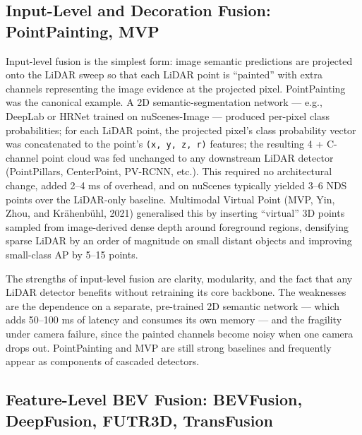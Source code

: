 \documentclass{article}
\begin{document}
\subsection{Input-Level and Decoration Fusion: PointPainting, MVP}\label{input-level-and-decoration-fusion-pointpainting-mvp}

Input-level fusion is the simplest form: image semantic predictions are projected onto the LiDAR sweep so that each LiDAR point is ``painted'' with extra channels representing the image evidence at the projected pixel. PointPainting \citep{vora2020pointpaintingseque} was the canonical example. A 2D semantic-segmentation network --- e.g., DeepLab or HRNet trained on nuScenes-Image --- produced per-pixel class probabilities; for each LiDAR point, the projected pixel's class probability vector was concatenated to the point's \texttt{(x,\ y,\ z,\ r)} features; the resulting 4 + C-channel point cloud was fed unchanged to any downstream LiDAR detector (PointPillars, CenterPoint, PV-RCNN, etc.). This required no architectural change, added 2--4 ms of overhead, and on nuScenes typically yielded 3--6 NDS points over the LiDAR-only baseline. Multimodal Virtual Point (MVP, Yin, Zhou, and Krähenbühl, 2021) generalised this by inserting ``virtual'' 3D points sampled from image-derived dense depth around foreground regions, densifying sparse LiDAR by an order of magnitude on small distant objects and improving small-class AP by 5--15 points.

The strengths of input-level fusion are clarity, modularity, and the fact that any LiDAR detector benefits without retraining its core backbone. The weaknesses are the dependence on a separate, pre-trained 2D semantic network --- which adds 50--100 ms of latency and consumes its own memory --- and the fragility under camera failure, since the painted channels become noisy when one camera drops out. PointPainting and MVP are still strong baselines and frequently appear as components of cascaded detectors.

\subsection{Feature-Level BEV Fusion: BEVFusion, DeepFusion, FUTR3D, TransFusion}\label{feature-level-bev-fusion-bevfusion-deepfusion-futr3d-transfusion}
\end{document}

